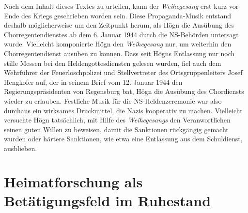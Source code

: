 \documentclass{book}
\begin{document}
Nach dem Inhalt dieses Textes zu urteilen, kann der \textit{Weihegesang}
erst kurz vor Ende des Kriegs geschrieben worden sein. Diese
Propaganda-Musik ent\-stand deshalb möglicherweise um den Zeitpunkt
herum, als Högn die Aus\-übung des Chorregentendienstes ab dem 6.
Januar 1944 durch die NS-Behör\-den untersagt wurde. Vielleicht
komponierte Högn den \textit{Weihegesang} nur, um weiterhin den
Chorregentendienst ausüben zu können. Dass seit Högns Ent\-lassung nur
noch stille Messen bei den Heldengottesdiensten gelesen wurden, fiel
auch dem Wehrführer der Feuerlöschpolizei und Stellvertreter des
Orts\-gruppenleiters Josef Hengkofer auf, der in seinem Brief vom 12.
Januar 1944 den Regierungspräsidenten von Regensburg bat, Högn die
Ausübung des Chordiensts wieder zu erlauben. Festliche Musik für die
NS-Heldenzeremo\-nie war also durchaus ein wirksames Druckmittel, die
Nazis kooperativ zu machen. Vielleicht versuchte Högn tatsächlich, mit
Hilfe des \textit{Weihegesangs} den Veranwortlichen seinen guten Willen
zu beweisen, damit die Sanktionen rück\-gängig gemacht wurden oder
härtere Sanktionen, wie etwa eine Entlassung aus dem Schuldienst,
ausblieben.

\section{Heimatforschung als Betätigungsfeld im Ruhestand}
\end{document}
